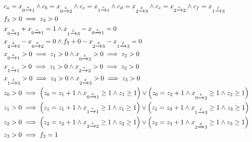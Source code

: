 \documentclass[acmsmall,review,anonymous]{acmart}\settopmatter{printfolios=true,printccs=false,printacmref=true}
\theoremstyle{definition}
\begin{document}
\begin{equation}
  \begin{aligned}
  &c_{a} = x_{0 \xrightarrow{a} 1} \land c_{b} = x_{0 \xrightarrow{b} 2} \land c_{c} = x_{1 \xrightarrow{c} 1} \land c_{d} = x_{2 \xrightarrow{d} 3} \land c_{e} = x_{2 \xrightarrow{e} 2} \land c_{f} = x_{1 \xrightarrow{f} 3}\\
  &f_{3} > 0 \implies z_{3} > 0\\
  & x_{0 \xrightarrow{b} 2} + x_{0 \xrightarrow{a} 1} = 1 \land  x_{1 \xrightarrow{f} 3} - x_{0 \xrightarrow{a} 1} = 0\\
  & x_{2 \xrightarrow{d} 3} - x_{0 \xrightarrow{b} 2} = 0 \land f_{3} + 0 - x_{2 \xrightarrow{d} 3} - x_{1 \xrightarrow{f} 3} = 0\\
  &x_{0 \xrightarrow{a} 1} > 0 \implies z_{1} > 0 \land x_{0 \xrightarrow{b} 2} > 0 \implies z_{2} > 0\\
  &x_{1 \xrightarrow{c} 1} > 0 \implies z_{1} > 0 \land x_{2 \xrightarrow{e} 2} > 0 \implies z_{2} > 0\\
  &x_{1 \xrightarrow{f} 3} > 0 \implies z_{3} > 0 \land x_{2 \xrightarrow{d} 3} > 0 \implies z_{3} > 0\\
  &z_{0} > 0 \implies \left(z_{0} = z_{1} + 1 \land x_{0 \xrightarrow{a} 1} \geq 1 \land z_{1} \geq 1\right) \lor \left(z_{0} = z_{2} + 1 \land x_{0 \xrightarrow{b} 2} \geq 1 \land z_{2} \geq 1\right)\\
  &z_{1} > 0 \implies \left(z_{1} = z_{1} + 1 \land x_{1 \xrightarrow{c} 1} \geq 1 \land z_{1} \geq 1\right) \lor \left(z_{1} = z_{3} + 1 \land x_{1 \xrightarrow{f} 3} \geq 1 \land z_{3} \geq 1\right)\\
  &z_{2} > 0 \implies \left(z_{2} = z_{2} + 1 \land x_{2 \xrightarrow{e} 2} \geq 1 \land z_{2} \geq 1\right) \lor \left(z_{2} = z_{3} + 1 \land x_{2 \xrightarrow{d} 3} \geq 1 \land z_{3} \geq 1\right)\\
  &z_{3} > 0 \implies f_{3} = 1
  \end{aligned}
  \label{eq:parikh-formula}
  \end{equation}
\end{document}
